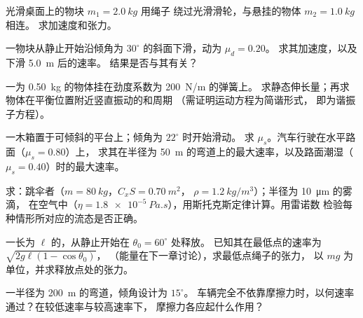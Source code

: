 \begin{exercise}[$\star$]\label{exo:b1:newton-dynamics:2}
光滑桌面上的物块 $m_1 = \qty{2.0}{kg}$ 用绳子
绕过光滑滑轮，与悬挂的物体 $m_2 = \qty{1.0}{kg}$ 相连。
求加速度和张力。
\end{exercise}

\begin{exercise}[$\star$]\label{exo:b1:newton-dynamics:3}
一物块从静止开始沿倾角为 $30^\circ$ 的斜面下滑，动为 $\mu_d = 0.20$。
求其加速度，以及下滑 \qty{5.0}{m} 后的速率。
结果是否与其有关？
\end{exercise}

\begin{exercise}[$\star$]\label{exo:b1:newton-dynamics:4}
一为 \qty{0.50}{kg} 的物体挂在劲度系数为 \qty{200}{N/m} 的弹簧上。
求静态伸长量；再求物体在平衡位置附近竖直振动的和周期
（需证明运动方程为简谐形式，
即为谐振子方程）。
\end{exercise}

\begin{exercise}[$\star\star$]\label{exo:b1:newton-dynamics:5}
一木箱置于可倾斜的平台上；倾角为 $22^\circ$ 时开始滑动。
求 $\mu_s$。汽车行驶在水平路面（$\mu_s = 0.80$）上，
求其在半径为 \qty{50}{m} 的弯道上的最大速率，以及路面潮湿（$\mu_s = 0.40$）时的最大速率。
\end{exercise}

\begin{exercise}[$\star\star$]\label{exo:b1:newton-dynamics:6}
求：跳伞者（$m = \qty{80}{kg}$，$C_xS = \qty{0.70}{m^2}$，
$\rho = \qty{1.2}{kg/m^3}$）；半径为 \qty{10}{\micro m} 的雾滴，
在空气中（$\eta = \qty{1.8e-5}{Pa.s}$），用斯托克斯定律计算。用雷诺数
检验每种情形所对应的流态是否正确。
\end{exercise}

\begin{exercise}[$\star\star$]\label{exo:b1:newton-dynamics:7}
一长为 $\ell$ 的，从静止开始在 $\theta_0 = 60^\circ$ 处释放。
已知其在最低点的速率为 $\sqrt{2g\ell(1 - \cos\theta_0)}$，
（能量在下一章讨论），求最低点绳子的张力，
以 $mg$ 为单位，并求释放点处的张力。
\end{exercise}

\begin{exercise}[$\star\star$]\label{exo:b1:newton-dynamics:8}
一半径为 \qty{200}{m} 的弯道，倾角设计为 $15^\circ$。
车辆完全不依靠摩擦力时，以何速率通过？在较低速率与较高速率下，
摩擦力各应起什么作用？
\end{exercise}

